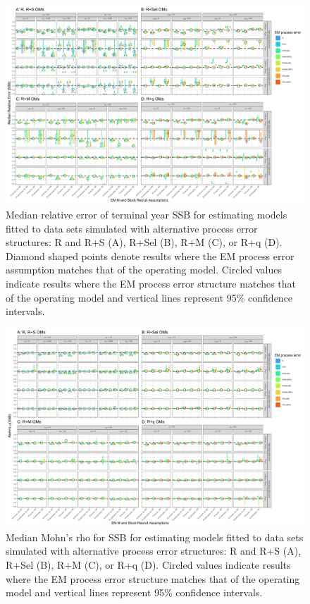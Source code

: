 \documentclass[
  12pt,
]{article}
\begin{document}
\begin{landscape}
\begin{figure}
\begin{center}
\includegraphics{term_SSB_bias_plots}
\end{center}
\caption{Median relative error of terminal year SSB for estimating models fitted to data sets simulated with alternative process error structures: R and R+S (A), R+Sel (B), R+M (C), or R+q (D).  Diamond shaped points denote results where the EM process error assumption matches that of the operating model. Circled values indicate results where the EM process error structure matches that of the operating model and vertical lines represent 95\% confidence intervals.}\label{SSB_rel_error}
\end{figure}
\end{landscape}

\begin{landscape}
\begin{figure}
\begin{center}
\includegraphics{mohns_rho_ssb_plots}
\end{center}
\caption{Median Mohn's rho for SSB for estimating models fitted to data sets simulated with alternative process error structures: R and R+S (A), R+Sel (B), R+M (C), or R+q (D). Circled values indicate results where the EM process error structure matches that of the operating model and vertical lines represent 95\% confidence intervals.}\label{mohns_rho_ssb}
\end{figure}
\end{landscape}
\end{document}
